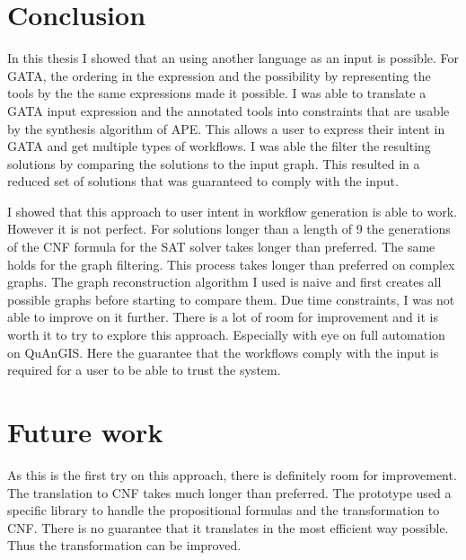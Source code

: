 \documentclass{article}
\begin{document}



\section{Conclusion}

In this thesis I showed that an using another language as an input is possible. For GATA, the ordering in the expression and the possibility by representing the tools by the the same expressions made it possible. I was able to translate a GATA input expression and the annotated tools into constraints that are usable by the synthesis algorithm of APE. This allows a user to express their intent in GATA and get multiple types of workflows. I was able the filter the resulting solutions by comparing the solutions to the input graph. This resulted in a reduced set of solutions that was guaranteed to comply with the input. 

I showed that this approach to user intent in workflow generation is able to work. However it is not perfect. For solutions longer than a length of 9 the generations of the CNF formula for the SAT solver takes longer than preferred. The same holds for the graph filtering. This process takes longer than preferred on complex graphs. The graph reconstruction algorithm I used is naive and first creates all possible graphs before starting to compare them. Due time constraints, I was not able to improve on it further. There is a lot of room for improvement and it is worth it to try to explore this approach. Especially with eye on full automation on QuAnGIS. Here the guarantee that the workflows comply with the input is required for a user to be able to trust the system. 





\section{Future work}

As this is the first try on this approach, there is definitely room for improvement. The translation to CNF takes much longer than preferred. The prototype used a specific library to handle the propositional formulas and the transformation to CNF. There is no guarantee that it translates in the most efficient way possible. Thus the transformation can be improved. 
\end{document}
